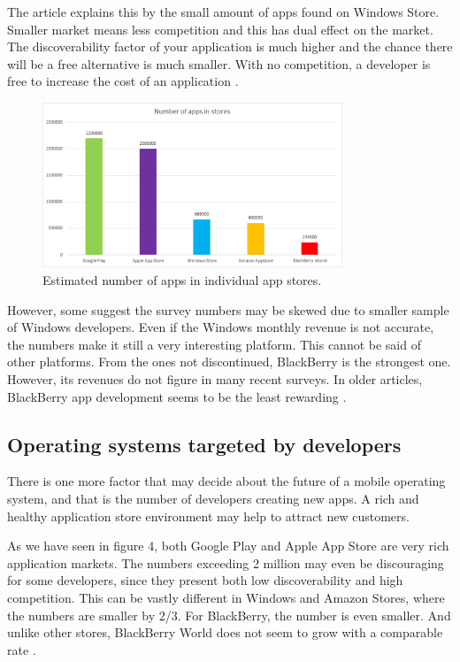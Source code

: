 \documentclass[english,master,public,dept460,male,cpdeclaration,oneside]{diploma}
\begin{document}
The article explains this by the small amount of apps found on Windows Store. Smaller market means less competition and this has dual effect on the market. The discoverability factor of your application is much higher and the chance there will be a free alternative is much smaller. With no competition, a developer is free to increase the cost of an application \cite{appsInStores}.

\begin{figure}
	\centering\includegraphics[width=0.8\textwidth]{Figures/appsInStores.png}
	\caption{Estimated number of apps in individual app stores.}
\end{figure}

However, some \cite{betanewsWinRevenue} suggest the survey numbers may be skewed due to smaller sample of Windows developers. Even if the Windows monthly revenue is not accurate, the numbers make it still a very interesting platform. This cannot be said of other platforms. From the ones not discontinued, BlackBerry is the strongest one. However, its revenues do not figure in many recent surveys. In older articles, BlackBerry app development seems to be the least rewarding \cite{bgrBBRevenues}. 

\subsection{Operating systems targeted by developers}
There is one more factor that may decide about the future of a mobile operating system, and that is the number of developers creating new apps. A rich and healthy application store environment may help to attract new customers. 

As we have seen in figure 4, both Google Play and Apple App Store are very rich application markets. The numbers exceeding 2 million may even be discouraging for some developers, since they present both low discoverability and high competition. This can be vastly different in Windows and Amazon Stores, where the numbers are smaller by 2/3. For BlackBerry, the number is even smaller. And unlike other stores, BlackBerry World does not seem to grow with a comparable rate \cite{wikiBBWorld}. 
\end{document}

